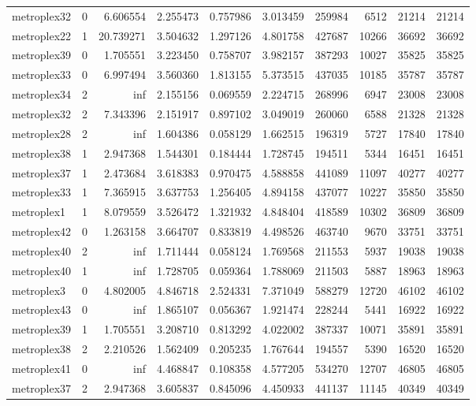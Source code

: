 \documentclass[../../../thesis.tex]{subfiles}
\begin{document}
\begin{longtable}{|l|r|r|r|r|r|r|r|r|r|}
metroplex32 & 0 & 6.606554 & 2.255473 & 0.757986 & 3.013459 & 259984 & 6512 & 21214 & 21214 \\
metroplex22 & 1 & 20.739271 & 3.504632 & 1.297126 & 4.801758 & 427687 & 10266 & 36692 & 36692 \\
metroplex39 & 0 & 1.705551 & 3.223450 & 0.758707 & 3.982157 & 387293 & 10027 & 35825 & 35825 \\
metroplex33 & 0 & 6.997494 & 3.560360 & 1.813155 & 5.373515 & 437035 & 10185 & 35787 & 35787 \\
metroplex34 & 2 & inf & 2.155156 & 0.069559 & 2.224715 & 268996 & 6947 & 23008 & 23008 \\
metroplex32 & 2 & 7.343396 & 2.151917 & 0.897102 & 3.049019 & 260060 & 6588 & 21328 & 21328 \\
metroplex28 & 2 & inf & 1.604386 & 0.058129 & 1.662515 & 196319 & 5727 & 17840 & 17840 \\
metroplex38 & 1 & 2.947368 & 1.544301 & 0.184444 & 1.728745 & 194511 & 5344 & 16451 & 16451 \\
metroplex37 & 1 & 2.473684 & 3.618383 & 0.970475 & 4.588858 & 441089 & 11097 & 40277 & 40277 \\
metroplex33 & 1 & 7.365915 & 3.637753 & 1.256405 & 4.894158 & 437077 & 10227 & 35850 & 35850 \\
metroplex1 & 1 & 8.079559 & 3.526472 & 1.321932 & 4.848404 & 418589 & 10302 & 36809 & 36809 \\
metroplex42 & 0 & 1.263158 & 3.664707 & 0.833819 & 4.498526 & 463740 & 9670 & 33751 & 33751 \\
metroplex40 & 2 & inf & 1.711444 & 0.058124 & 1.769568 & 211553 & 5937 & 19038 & 19038 \\
metroplex40 & 1 & inf & 1.728705 & 0.059364 & 1.788069 & 211503 & 5887 & 18963 & 18963 \\
metroplex3 & 0 & 4.802005 & 4.846718 & 2.524331 & 7.371049 & 588279 & 12720 & 46102 & 46102 \\
metroplex43 & 0 & inf & 1.865107 & 0.056367 & 1.921474 & 228244 & 5441 & 16922 & 16922 \\
metroplex39 & 1 & 1.705551 & 3.208710 & 0.813292 & 4.022002 & 387337 & 10071 & 35891 & 35891 \\
metroplex38 & 2 & 2.210526 & 1.562409 & 0.205235 & 1.767644 & 194557 & 5390 & 16520 & 16520 \\
metroplex41 & 0 & inf & 4.468847 & 0.108358 & 4.577205 & 534270 & 12707 & 46805 & 46805 \\
metroplex37 & 2 & 2.947368 & 3.605837 & 0.845096 & 4.450933 & 441137 & 11145 & 40349 & 40349 \\

\end{longtable}
\end{document}
